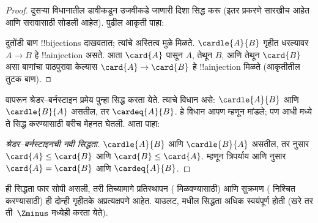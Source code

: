\documentclass[../../../include/open-logic-section]{subfiles}
\begin{document}
\begin{proof}
दुसऱ्या विधानातील डावीकडून उजवीकडे जाणारी दिशा सिद्ध करू (इतर प्रकरणे सारखीच आहेत आणि सरावासाठी सोडली आहेत). पुढील आकृती पाहा:
\begin{center}
\end{center}
दुतोंडी बाण !!{bijection}s दाखवतात; त्यांचे अस्तित्व  मुळे मिळते. $\cardle{A}{B}$ गृहीत धरल्यावर $A\to B$ हे !!a{injection} असते. आता $\card{A}$ पासून $A$, तेथून $B$, आणि तेथून $\card{B}$ असा बाणांचा पाठपुरावा केल्यास $\card{A} \to \card{B}$ हे !!a{injection} मिळते (आकृतीतील तुटक बाण).
\end{proof}\noindent {} वापरून श्रेडर--बर्नस्टाइन प्रमेय पुन्हा सिद्ध करता येते. त्याचे विधान असे: $\cardle{A}{B}$ आणि $\cardle{B}{A}$ असतील, तर $\cardeq{A}{B}$. हे विधान आपण  म्हणून मांडले; पण आधी  मध्ये ते सिद्ध करण्यासाठी बरीच मेहनत घेतली. आता पाहा:

\begin{proof}[श्रेडर--बर्नस्टाइनची नवी सिद्धता]
$\cardle{A}{B}$ आणि $\cardle{B}{A}$ असतील, तर  नुसार $\card{A} \leq \card{B}$ आणि $\card{B} \leq \card{A}$. म्हणून त्रिपर्याय आणि  नुसार $\card{A} = \card{B}$ आणि $\cardeq{A}{B}$.
\end{proof}
\noindent
ही सिद्धता फार सोपी असली, तरी तिच्यामागे प्रतिस्थापन ( मिळवण्यासाठी) आणि सुक्रमण ( निश्चित करण्यासाठी) ही दोन्ही गृहीतके अप्रत्यक्षपणे आहेत. याउलट,  मधील सिद्धता अधिक स्वयंपूर्ण होती (खरे तर ती~$\Zminus$ मध्येही करता येते).
\end{document}
